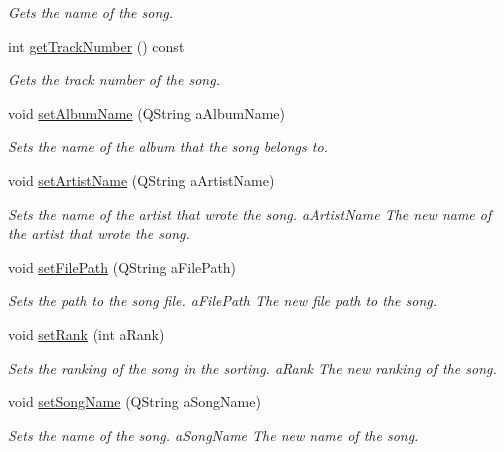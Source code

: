 \begin{DoxyCompactItemize}
\begin{DoxyCompactList}\small\item\em Gets the name of the song. \end{DoxyCompactList}\item 
int \mbox{\hyperlink{class_song_aafed63304c6f308bb0c55c3ac206ad4a}{get\+Track\+Number}} () const
\begin{DoxyCompactList}\small\item\em Gets the track number of the song. \end{DoxyCompactList}\item 
void \mbox{\hyperlink{class_song_ac9c21b02ebe7a5801c2f36f255b38e49}{set\+Album\+Name}} (Q\+String a\+Album\+Name)
\begin{DoxyCompactList}\small\item\em Sets the name of the album that the song belongs to. \end{DoxyCompactList}\item 
void \mbox{\hyperlink{class_song_ab071f31965057c073c4e25a846810f8d}{set\+Artist\+Name}} (Q\+String a\+Artist\+Name)
\begin{DoxyCompactList}\small\item\em Sets the name of the artist that wrote the song. {\itshape a\+Artist\+Name} The new name of the artist that wrote the song. \end{DoxyCompactList}\item 
void \mbox{\hyperlink{class_song_ac2053f95eea7a3f96fb7d216e07637d7}{set\+File\+Path}} (Q\+String a\+File\+Path)
\begin{DoxyCompactList}\small\item\em Sets the path to the song file. {\itshape a\+File\+Path} The new file path to the song. \end{DoxyCompactList}\item 
void \mbox{\hyperlink{class_song_acbfe66b799c390ea11be07907835f057}{set\+Rank}} (int a\+Rank)
\begin{DoxyCompactList}\small\item\em Sets the ranking of the song in the sorting. {\itshape a\+Rank} The new ranking of the song. \end{DoxyCompactList}\item 
void \mbox{\hyperlink{class_song_a8ae97c3e5d99c7e8df2e1b7b4f0274ec}{set\+Song\+Name}} (Q\+String a\+Song\+Name)
\begin{DoxyCompactList}\small\item\em Sets the name of the song. {\itshape a\+Song\+Name} The new name of the song. \end{DoxyCompactList}\item 

\end{DoxyCompactItemize}

